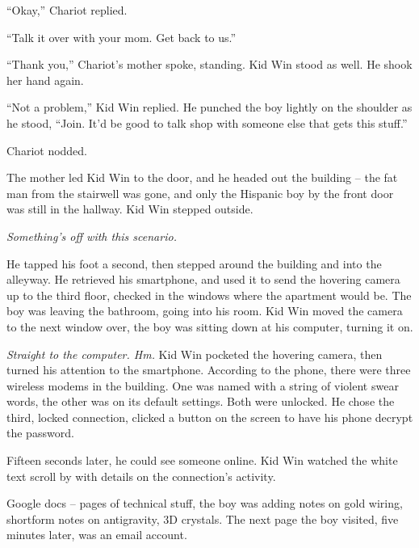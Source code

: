 ``Okay,'' Chariot replied.



``Talk it over with your mom.  Get back to us.''



``Thank you,'' Chariot's mother spoke, standing.  Kid Win stood as well.  He shook her hand again.



``Not a problem,'' Kid Win replied.  He punched the boy lightly on the shoulder as he stood, ``Join.  It'd be good to talk shop with someone else that gets this stuff.''



Chariot nodded.



The mother led Kid Win to the door, and he headed out the building – the fat man from the stairwell was gone, and only the Hispanic boy by the front door was still in the hallway.  Kid Win stepped outside.



\emph{Something's off with this scenario.}



He tapped his foot a second, then stepped around the building and into the alleyway.  He retrieved his smartphone, and used it to send the hovering camera up to the third floor, checked in the windows where the apartment would be.  The boy was leaving the bathroom, going into his room.  Kid Win moved the camera to the next window over, the boy was sitting down at his computer, turning it on.



\emph{Straight to the computer.  Hm.  }Kid Win pocketed the hovering camera, then turned his attention to the smartphone.  According to the phone, there were three wireless modems in the building.  One was named with a string of violent swear words, the other was on its default settings.  Both were unlocked.  He chose the third, locked connection, clicked a button on the screen to have his phone decrypt the password.



Fifteen seconds later, he could see someone online.  Kid Win watched the white text scroll by with details on the connection's activity.



Google docs – pages of technical stuff, the boy was adding notes on gold wiring, shortform notes on antigravity, 3D crystals.  The next page the boy visited, five minutes later, was an email account.



